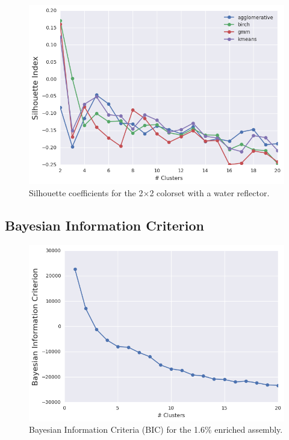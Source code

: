 \begin{figure}[h!]
\centering
\includegraphics[width=0.87\linewidth]{figures/results/model-select/reflector/silhouette-combined-U238-nu-fission-1}
\vspace{2mm}
\caption[Silhouette coefficients for the 2$\times$2 colorset with reflector]{Silhouette coefficients for the 2$\times$2 colorset with a water reflector.}
\label{fig:chap11-refl-silhouette-coeff}
\end{figure}

\clearpage

\subsection{Bayesian Information Criterion}
\label{subsec:chap11-bic}

\begin{figure}[h!]
\centering
\includegraphics[width=0.87\linewidth]{figures/results/model-select/assm-16/bic-combined-U238-capture-1}
\vspace{2mm}
\caption[Silhouette coefficients for the 1.6\% enriched assembly]{Bayesian Information Criteria (BIC) for the 1.6\% enriched assembly.}
\label{fig:chap11-assm-16-bic}
\end{figure}

